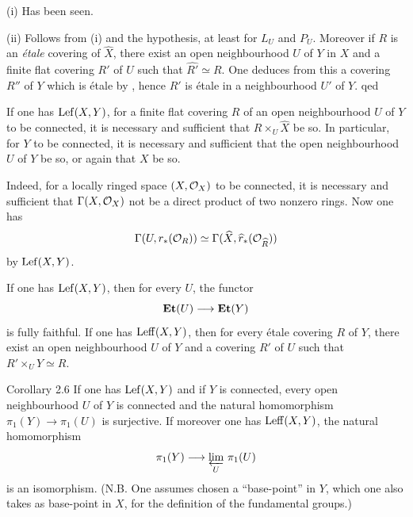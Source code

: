 (i) Has been seen.

(ii) Follows from (i) and the hypothesis, at least for $L_U$ and
$P_U$. Moreover if $R$ is an \emph{\'etale} covering of $\hat{X}$,
there exist an open neighbourhood $U$ of $Y$ in $X$ and a finite flat
covering $R'$ of $U$ such that $\widehat{R'} \simeq R$. One deduces
from this a covering $R''$ of $Y$ which is \'etale by ,
hence $R'$ is \'etale in a neighbourhood $U'$ of $Y$. qed

\begin{corollary} \label{X.2.4}
If one has $\operatorname{Lef} (X, Y)$, for a finite flat covering $R$ of an open
neighbourhood $U$ of $Y$ to be connected, it is necessary and
sufficient that $R \times_U \hat{X}$ be so. In particular, for $Y$ to
be connected, it is necessary and sufficient that the open
neighbourhood $U$ of $Y$ be so, or again that $X$ be so.
\end{corollary}

Indeed, for a locally ringed space $(X, \mathcal{O}_X)$ to be connected, it is
necessary and sufficient that $\Gamma(X, \mathcal{O}_X)$ not be a direct product
of two nonzero rings. Now one has
\[
\Gamma(U, r_\ast({\mathcal O}_R)) \simeq \Gamma(\widehat{X}, \widehat{r}_\ast({\mathcal O}_{\widehat{R}}))
\]
by $\operatorname{Lef}(X, Y)$.

\begin{corollary} \label{X.2.5} If one has $\operatorname{Lef} (X, Y)$, then for every $U$, the functor
\[
\Et(U) \to \Et(Y)
\]
is fully faithful. If one has $\operatorname{Leff}(X, Y)$, then for every \'etale
covering $R$ of $Y$, there exist an open neighbourhood $U$ of $Y$ and a
covering $R'$ of $U$ such that $R' \times_U Y \simeq R$.
\end{corollary}

\label{X.2.6}
\begin{enonce*}{Corollary 2.6\ndemark}
If one has $\operatorname{Lef}(X, Y)$ and if $Y$ is connected, every open
neighbourhood $U$ of $Y$ is connected and the natural homomorphism
$\pi_1(Y)\to\pi_1(U)$ is surjective. If moreover one has
$\operatorname{Leff}(X, Y)$, the natural homomorphism
\[
\pi_1(Y) \to \varprojlim_{U}\, \pi_1(U)
\]
is an isomorphism. (N.B. One assumes chosen a ``base-point'' in $Y$,
which one also takes as base-point in $X$, for the definition of the
fundamental groups.)
\end{enonce*}

